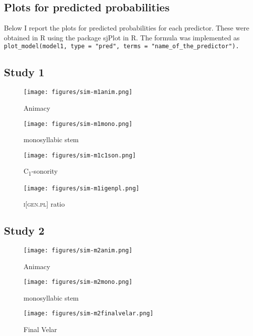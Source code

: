 \documentclass[output=paper,colorlinks,citecolor=brown]{langscibook}
\begin{document}
\begin{paperappendix}
\section{Plots for predicted probabilities}

Below I report the plots for predicted probabilities for each predictor. These were obtained in R using the package sjPlot \citep{sjplot} in R. The formula was implemented as \texttt{plot\_model(model1, type = "pred", terms = "name\_of\_the\_predictor").}

\subsection{Study 1}

\begin{figure}
\caption{Animacy}
\texttt{[image: figures/sim-m1anim.png]} %
\end{figure}

\begin{figure}
\caption{monosyllabic stem}
\texttt{[image: figures/sim-m1mono.png]} %
\end{figure}

\begin{figure}
\caption{C\textsubscript{1}-sonority}
\texttt{[image: figures/sim-m1c1son.png]} %
\end{figure}

\begin{figure}
\caption{\textsc{i[gen.pl]} ratio}
\texttt{[image: figures/sim-m1igenpl.png]} %
\end{figure}


\subsection{Study 2}
\begin{figure}
\caption{Animacy}
\texttt{[image: figures/sim-m2anim.png]} %
\end{figure}

\begin{figure}
\caption{monosyllabic stem}
\texttt{[image: figures/sim-m2mono.png]} %
\end{figure}


\begin{figure}
\caption{Final Velar}
\texttt{[image: figures/sim-m2finalvelar.png]} %
\end{figure}


\end{paperappendix}
\end{document}
